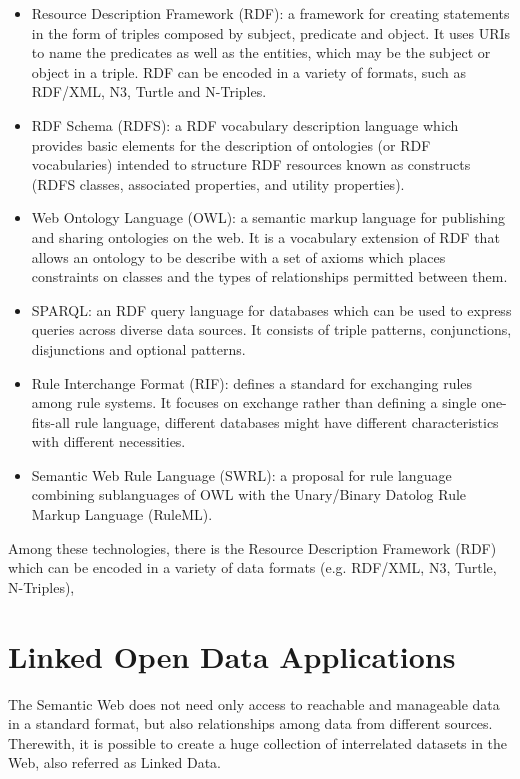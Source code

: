 \begin{itemize}
 \item Resource Description Framework (RDF): a framework for creating statements in the form of triples composed by
subject, predicate and object. It uses URIs to name the predicates as well as the entities, which may be the subject or
object in a triple. RDF can be encoded in a variety of formats, such as RDF/XML, N3, Turtle and N-Triples.
 \item RDF Schema (RDFS): a RDF vocabulary description language which provides basic elements for the description of
ontologies (or RDF vocabularies) intended to structure RDF resources known as constructs (RDFS classes, associated
properties, and utility properties).
 \item Web Ontology Language (OWL): a semantic markup language for publishing and sharing ontologies on the web. It is a
vocabulary extension of RDF that allows an ontology to be describe with a set of axioms which places constraints on
classes and the types of relationships permitted between them.
 \item SPARQL: an RDF query language for databases which can be used to express queries across diverse data sources. It
consists of triple patterns, conjunctions, disjunctions and optional patterns. 
 \item Rule Interchange Format (RIF): defines a standard for exchanging rules among rule systems. It focuses on
exchange rather than defining a single one-fits-all rule language, different databases might have different
characteristics with different necessities.
  \item Semantic Web Rule Language (SWRL): a proposal for rule language combining sublanguages of OWL with the
Unary/Binary Datolog Rule Markup Language (RuleML).
\end{itemize}



Among these technologies, there is the Resource Description Framework (RDF) which can be encoded in a variety
of data formats (e.g. RDF/XML, N3, Turtle, N-Triples), 

\section{Linked Open Data Applications}

The Semantic Web does not need only access to reachable and manageable data in a standard format, but also
relationships among data from different sources. Therewith, it is possible to create a huge collection of interrelated
datasets in the Web, also referred as Linked Data.

